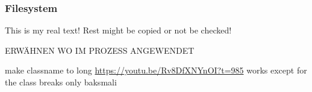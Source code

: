 \subsubsection{Filesystem} \label{subsubsection:counter-reengineering-break-filesystem}
This is my real text! Rest might be copied or not be checked!

ERWÄHNEN WO IM PROZESS ANGEWENDET\newline

make classname to long\newline
\url{https://youtu.be/Rv8DfXNYnOI?t=985} works except for the class\newline
breaks only baksmali

